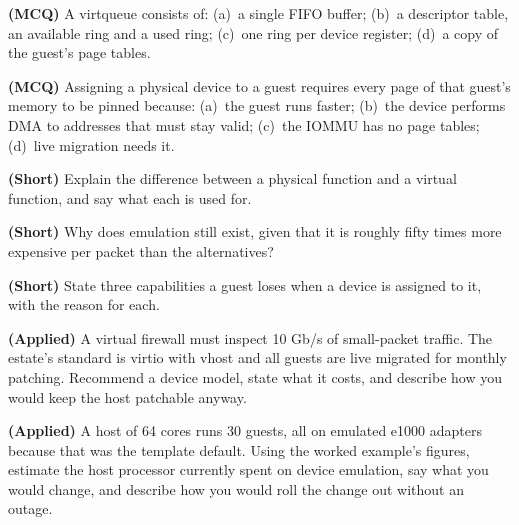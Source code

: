 \begin{reviewq}
  \item \textbf{(MCQ)} A virtqueue consists of: (a)~a single FIFO buffer;
        (b)~a descriptor table, an available ring and a used ring;
        (c)~one ring per device register; (d)~a copy of the guest's page
        tables.
  \item \textbf{(MCQ)} Assigning a physical device to a guest requires every
        page of that guest's memory to be pinned because: (a)~the guest runs
        faster; (b)~the device performs DMA to addresses that must stay valid;
        (c)~the IOMMU has no page tables; (d)~live migration needs it.
  \item \textbf{(Short)} Explain the difference between a physical function and
        a virtual function, and say what each is used for.
  \item \textbf{(Short)} Why does emulation still exist, given that it is
        roughly fifty times more expensive per packet than the alternatives?
  \item \textbf{(Short)} State three capabilities a guest loses when a device
        is assigned to it, with the reason for each.
  \item \textbf{(Applied)} A virtual firewall must inspect 10 Gb/s of
        small-packet traffic. The estate's standard is virtio with vhost and
        all guests are live migrated for monthly patching. Recommend a device
        model, state what it costs, and describe how you would keep the host
        patchable anyway.
  \item \textbf{(Applied)} A host of 64 cores runs 30 guests, all on emulated
        e1000 adapters because that was the template default. Using the worked
        example's figures, estimate the host processor currently spent on
        device emulation, say what you would change, and describe how you would
        roll the change out without an outage.
\end{reviewq}
